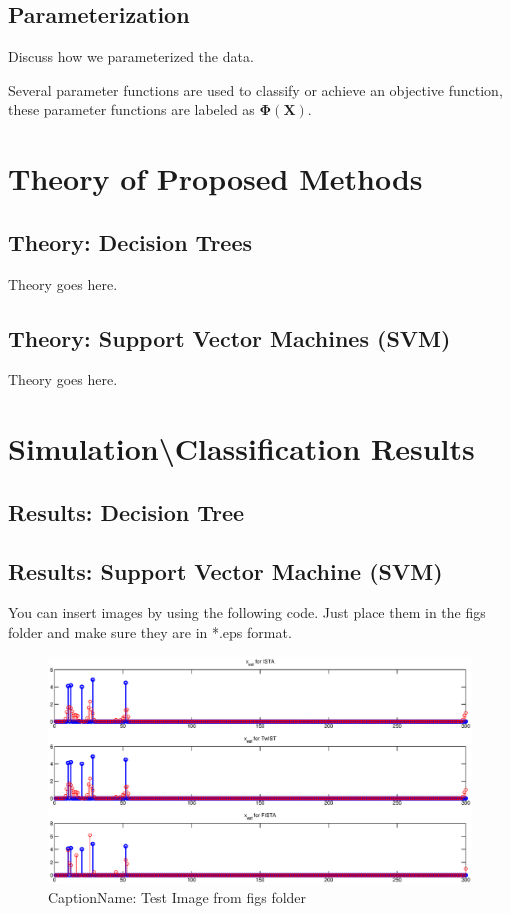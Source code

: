\documentclass[fleqn]{article}
\begin{document}
\subsection{Parameterization}
\label{subsec:Parameterization}
Discuss how we parameterized the data.

Several parameter functions are used to classify or achieve an objective function, these parameter functions are labeled as $\mathbf{\Phi}\left(\mathbf{X}\right)$. 

\section{Theory of Proposed Methods}
\label{sec:Theory}

\subsection{Theory: Decision Trees}
\label{sub:theoryDecisionTrees}
Theory goes here.

\subsection{Theory: Support Vector Machines (SVM)}
\label{sub:theorySVM}
Theory goes here.

\section[Results]{Simulation\textbackslash Classification Results}
\label{sec:Results}

\subsection{Results: Decision Tree}
\label{sub:resultsTrees}

\subsection{Results: Support Vector Machine (SVM)}
\label{sub:resultsSVM}
You can insert images by using the following code.  Just place them in the figs folder and make sure they are in *.eps format.\cite{bishop:2006}
%
\begin{figure}[H]
	{\centering
		\includegraphics[trim = 10mm 10mm 10mm 0mm, clip,width=1.0\textwidth]{figs/Test_Image}
		\caption{CaptionName: Test Image from figs folder}
		\label{fig:Test}
	}
\end{figure}
\end{document}
